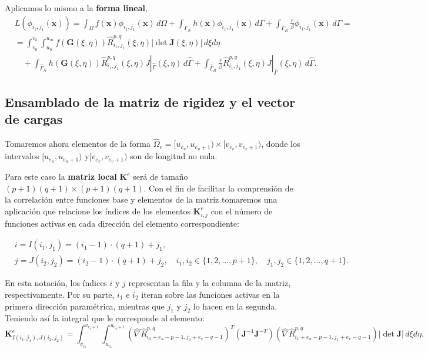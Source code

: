 \documentclass[11pt]{book}
\theoremstyle{plain} %
\theoremstyle{definition} %
\theoremstyle{definition} %
\begin{document}
Aplicamos lo mismo a la \textbf{forma lineal},
{\setlength{\abovedisplayskip}{3pt}
\setlength{\belowdisplayskip}{3pt}
\begin{align*}
    &L(\phi_{i_1,j_1}(\mathbf{x})) = \int_{\Omega}f(\mathbf{x})\phi_{i_1,j_1}(\mathbf{x}) \, d\Omega \nonumber + \int_{\Gamma_N}h(\mathbf{x})\phi_{i_1,j_1}(\mathbf{x}) \, d\Gamma + \int_{\Gamma_R}\frac{r}{\beta}\phi_{i_1,j_1}(\mathbf{x}) \, d\Gamma =\\[10pt]
    &= \int_{v_0}^{v_{k}}\int_{u_0}^{u_{m}}f(\mathbf{G}(\xi,\eta))\hat{R}_{i_1,j_1}^{p,q}(\xi,\eta)|\det \mathbf{J}(\xi,\eta)| \, d\xi d\eta \nonumber \\
    &\quad + \int_{\hat{\Gamma}_N} h(\mathbf{G}(\xi,\eta))\hat{R}_{i_1,j_1}^{p,q}(\xi,\eta) J|_{\hat{\Gamma}}(\xi,\eta) \, d\hat{\Gamma} + \int_{\hat{\Gamma}_R} \frac{r}{\beta}\hat{R}_{i_1,j_1}^{p,q}(\xi,\eta) J|_{\hat{\Gamma}}(\xi,\eta) \, d\hat{\Gamma}.
\end{align*}
}

\vspace{-0.25cm}

\subsection{Ensamblado de la matriz de rigidez y el vector de cargas}

Tomaremos ahora elementos de la forma $\hat{\Omega}_e=[u_{e_u},u_{{e_u}+1})\times[v_{e_v}, v_{{e_v}+1})$, donde los intervalos $[u_{e_u},u_{{e_u}+1})$ y$[v_{e_v}, v_{{e_v}+1})$ son de longitud no nula.

Para este caso la \textbf{matriz local} $\mathbf{K}^e$ será de tamaño $(p+1)(q+1)\times(p+1)(q+1)$. Con el fin de facilitar la comprensión de la correlación entre funciones base y elementos de la matriz tomaremos una aplicación que relacione los índices de los elementos $\mathbf{K}^e_{i,j}$ con el número de funciones activas en cada dirección del elemento correspondiente:

\vspace{-0.7cm}

\begin{align}
    \label{eq:indices}
    &i=I(i_1,j_1)=(i_1-1)\cdot(q+1)+j_1, \\
    &j=J(i_2,j_2)=(i_2-1)\cdot(q+1)+j_2, \quad i_1, i_2 \in \{1,2,\dots,p+1\}, \quad j_1, j_2 \in \{1,2,\dots,q+1\}.
\end{align}

En esta notación, los índices $i$ y $j$ representan la fila y la columna de la matriz, respectivamente. Por su parte, $i_1$ e $i_2$ iteran sobre las funciones activas en la primera dirección paramétrica, mientras que $j_1$ y $j_2$ lo hacen en la segunda. Teniendo así la integral que le corresponde al elemento:
{\setlength{\abovedisplayskip}{2pt}
\setlength{\belowdisplayskip}{2pt}
\begin{equation*} 
    \mathbf{K}^e_{I(i_1,j_1),J(i_2,j_2)} =\int_{v_{e_v}}^{v_{{e_v}+1}}\int_{u_{e_u}}^{u_{{e_u}+1}} \left(\hat{\nabla}\hat{R}_{i_2 + e_u - p - 1, j_2 + e_v - q - 1}^{p,q}\right)^T \left( \mathbf{J}^{-1} \mathbf{J}^{-T} \right) \left(\hat{\nabla}\hat{R}_{i_1 + e_u - p - 1, j_1 + e_v - q - 1}^{p,q}\right) |\det \mathbf{J}| \, d\xi d\eta.
\end{equation*}
}
\end{document}
